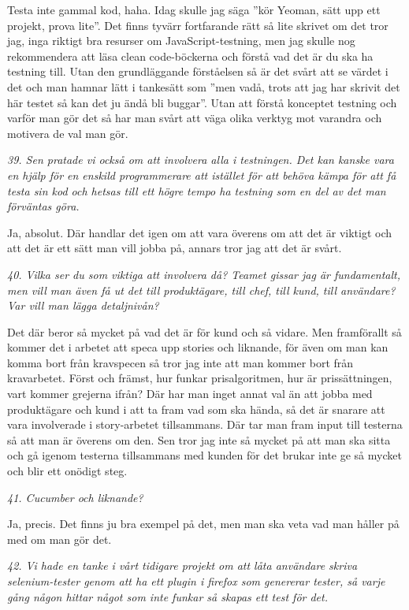 \documentclass[11pt]{article}
\begin{document}
Testa inte gammal kod, haha. Idag skulle jag säga ”kör Yeoman, sätt upp ett projekt, prova lite”. Det finns tyvärr fortfarande rätt så lite skrivet om det tror jag, inga riktigt bra resurser om JavaScript-testning, men jag skulle nog rekommendera att läsa clean code-böckerna och förstå vad det är du ska ha testning till. Utan den grundläggande förståelsen så är det svårt att se värdet i det och man hamnar lätt i tankesätt som ”men vadå, trots att jag har skrivit det här testet så kan det ju ändå bli buggar”. Utan att förstå konceptet testning och varför man gör det så har man svårt att väga olika verktyg mot varandra och motivera de val man gör.

\emph{39. Sen pratade vi också om att involvera alla i testningen. Det kan kanske vara en hjälp för en enskild programmerare att istället för att behöva kämpa för att få testa sin kod  och hetsas till ett högre tempo ha testning som en del av det man förväntas göra.}

Ja, absolut. Där handlar det igen om att vara överens om att det är viktigt och att det är ett sätt man vill jobba på, annars tror jag att det är svårt.

\emph{40. Vilka ser du som viktiga att involvera då? Teamet gissar jag är fundamentalt, men vill man även få ut det till produktägare, till chef, till kund, till användare? Var vill man lägga detaljnivån?}

Det där beror så mycket på vad det är för kund och så vidare. Men framförallt så kommer det i arbetet att speca upp stories och liknande, för även om man kan komma bort från kravspecen så tror jag inte att man kommer bort från kravarbetet. Först och främst, hur funkar prisalgoritmen, hur är prissättningen, vart kommer grejerna ifrån? Där har man inget annat val än att jobba med produktägare och kund i att ta fram vad som ska hända, så det är snarare att vara involverade i story-arbetet tillsammans. Där tar man fram input till testerna så att man är överens om den. Sen tror jag inte så mycket på att man ska sitta och gå igenom testerna tillsammans med kunden för det brukar inte ge så mycket och blir ett onödigt steg.

\emph{41. Cucumber och liknande?}

Ja, precis. Det finns ju bra exempel på det, men man ska veta vad man håller på med om man gör det.

\emph{42. Vi hade en tanke i vårt tidigare projekt om att låta användare skriva selenium-tester genom att ha ett plugin i firefox som genererar tester, så varje gång någon hittar något som inte funkar så skapas ett test för det.}
\end{document}
